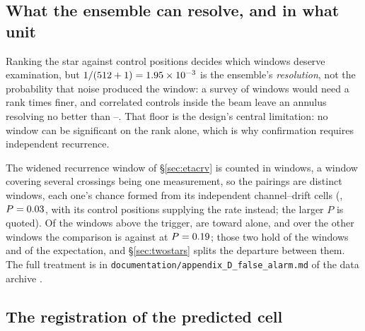 \subsection{What the ensemble can resolve, and in what unit}

Ranking the star against \NCtrl{} control positions decides which windows
deserve examination, but $1/(512+1)=1.95\times10^{-3}$ is the ensemble's
\emph{resolution}, not the probability that noise produced the window: a
survey of \NWindows{} windows would need a rank \BonfRankRatio{} times finer,
and correlated controls inside the beam leave an annulus resolving no better
than \RankEffLo--\RankEffHi. That floor is the design's central limitation:
no window can be significant on the rank alone, which is why confirmation
requires independent recurrence.

The widened recurrence window of \S\ref{sec:etacrv} is counted in windows, a
window covering several crossings being one measurement, so the \WuNRead{}
pairings are \WuNWin{} distinct windows, each one's chance formed from its
independent channel--drift cells (\WuExpWinCtrl{}, $P=0.03$, with
its control positions supplying the rate instead; the larger $P$ is quoted).
Of the \WuNWinExc{} windows above the trigger,
\WuNWinExcTwo{} are toward \WuTwoStars{} alone, and
over the other \WuNWinRest{} windows the comparison is \WuNWinRestExc{}
against \WuExpRest{} at $P=0.19$; those two hold \TwNWinTwo{} of the
windows and \TwExpTwo{} of the expectation, and \S\ref{sec:twostars} splits
the departure between them. The full treatment is in
\texttt{documentation/\allowbreak appendix\_D\_false\_alarm.md} of the data archive
\citep{SIdeposit}.

\subsection{The registration of the predicted cell}
\label{sec:regbudget}


